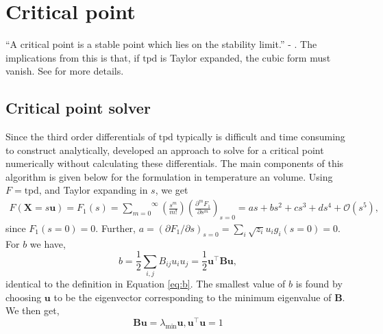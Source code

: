 \documentclass[english]{../thermomemo/thermomemo}
\newcommand{\tpd}{\ensuremath{\text{tpd}}\xspace}
\begin{document}
\section{Critical point}
``A critical point is a stable point which lies on the stability
limit.'' - \citet{Heidemann1980}. The implications from this is that,
if \tpd is Taylor expanded, the cubic form must vanish. See
\cite{Heidemann1980} for more details.


\subsection{Critical point solver}
Since the third order differentials of \tpd typically is difficult and
time consuming to construct analytically, \citet{Michelsen1984}
developed an approach to solve for a critical point numerically
without calculating these differentials. The main components of this
algorithm is given below for the formulation in temperature an volume.
Using $F = \tpd$, and Taylor expanding in $s$, we get
\begin{align}
F(\mathbf{X} = s\mathbf{u}) = F_1(s) = \overset{\infty}{\underset{m=0}{\sum}}\left(\frac{s^m}{m!}\right)\left(\frac{\partial^m F_1}{\partial s^m}\right)_{s=0} = as + bs^2 + cs^3 + ds^4 + \mathcal{O}(s^5),
\label{eq:sTaylor}
\end{align}
since $F_1(s=0) = 0$. Further,
$a = \left(\partial F_1/\partial s\right)_{s=0} =
\underset{i}{\sum}\sqrt{z_i}u_ig_i(s=0)=0$. For $b$ we have,
\begin{equation}
b = \frac{1}{2}{\underset{i,j}{\sum}}B_{ij}u_iu_j = \frac{1}{2}\mathbf{u}^\intercal \mathbf{B} \mathbf{u},
\label{eq:bdef}
\end{equation}
identical to the definition in Equation \ref{eq:b}. The smallest value
of $b$ is found by choosing $\mathbf{u}$ to be the eigenvector
corresponding to the minimum eigenvalue of $\mathbf{B}$. We then get,
\begin{equation}
\mathbf{B} \mathbf{u} = \lambda_{\text{min}} \mathbf{u}, \mathbf{u}^\intercal\mathbf{u} = 1
\label{eq:brelation}
\end{equation}
\end{document}
